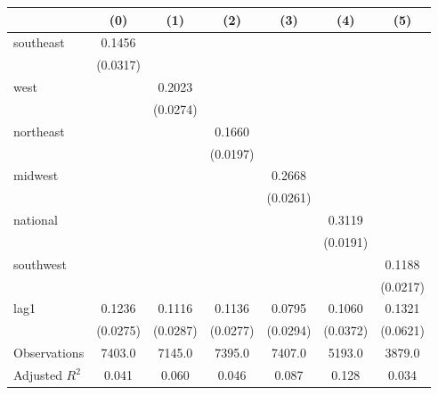 \begin{tabular}{lcccccc}
\toprule
 & (0) & (1) & (2) & (3) & (4) & (5) \\
\midrule
southeast & 0.1456 &  &  &  &  &  \\
\vspace{0.2cm}
 & (0.0317) &  &  &  &  &  \\
west &  & 0.2023 &  &  &  &  \\
\vspace{0.2cm}
 &  & (0.0274) &  &  &  &  \\
northeast &  &  & 0.1660 &  &  &  \\
\vspace{0.2cm}
 &  &  & (0.0197) &  &  &  \\
midwest &  &  &  & 0.2668 &  &  \\
\vspace{0.2cm}
 &  &  &  & (0.0261) &  &  \\
national &  &  &  &  & 0.3119 &  \\
\vspace{0.2cm}
 &  &  &  &  & (0.0191) &  \\
southwest &  &  &  &  &  & 0.1188 \\
\vspace{0.2cm}
 &  &  &  &  &  & (0.0217) \\
lag1 & 0.1236 & 0.1116 & 0.1136 & 0.0795 & 0.1060 & 0.1321 \\
\vspace{0.2cm}
 & (0.0275) & (0.0287) & (0.0277) & (0.0294) & (0.0372) & (0.0621) \\
\midrule
Observations & 7403.0 & 7145.0 & 7395.0 & 7407.0 & 5193.0 & 3879.0 \\
Adjusted $R^2$ & 0.041 & 0.060 & 0.046 & 0.087 & 0.128 & 0.034 \\
\bottomrule
\end{tabular}